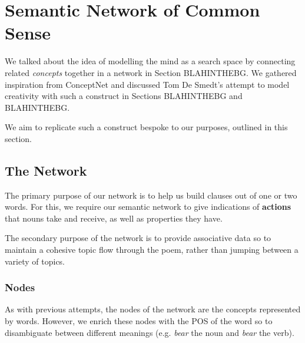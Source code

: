 


\section{Semantic Network of Common Sense}
\label{sec:common-sense}
We talked about the idea of modelling the mind as a search space by connecting related \textit{concepts} together in a network in Section BLAHINTHEBG. We gathered inspiration from ConceptNet and discussed Tom De Smedt's attempt to model creativity with such a construct in Sections BLAHINTHEBG and BLAHINTHEBG.

We aim to replicate such a construct bespoke to our purposes, outlined in this section.

\subsection{The Network}
The primary purpose of our network is to help us build clauses out of one or two words. For this, we require our semantic network to give indications of \textbf{actions} that nouns take and receive, as well as properties they have.

The secondary purpose of the network is to provide associative data so to maintain a cohesive topic flow through the poem, rather than jumping between a variety of topics. 

\subsubsection{Nodes}
As with previous attempts, the nodes of the network are the concepts represented by words. However, we enrich these nodes with the POS of the word so to disambiguate between different meanings (e.g. \textit{bear} the noun and \textit{bear} the verb).

